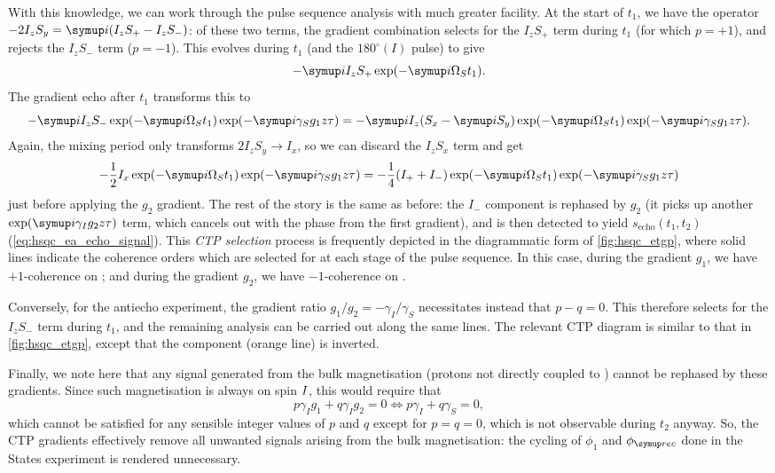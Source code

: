 With this knowledge, we can work through the pulse sequence analysis with much greater facility.
At the start of $t_1$, we have the operator $-2I_zS_y = \mi(I_zS_+ - I_zS_-)$: of these two terms, the gradient combination selects for the $I_zS_+$ term during $t_1$ (for which $p = +1$), and rejects the $I_zS_-$ term ($p = -1$).
This evolves during $t_1$ (and the $180^\circ(I)$ pulse) to give
\begin{equation}
    \label{eq:hsqc_echo_shift_aftert1}
    -\mi I_zS_+ \exp(-\mi \Omega_S t_1).
\end{equation}
The gradient echo after $t_1$ transforms this to
\begin{equation}
    \label{eq:hsqc_echo_shift_after_g1}
    -\mi I_zS_- \exp(-\mi \Omega_S t_1)\exp(-\mi \gamma_S g_1 z\tau) = -\mi I_z(S_x - \mi S_y) \exp(-\mi \Omega_S t_1)\exp(-\mi \gamma_S g_1 z\tau).
\end{equation}
Again, the mixing period only transforms $2I_zS_y \to I_x$, so we can discard the $I_zS_x$ term and get
\begin{equation}
    \label{eq:hsqc_echo_shift_before_g2}
    -\frac{1}{2} I_x \exp(-\mi \Omega_S t_1)\exp(-\mi \gamma_S g_1 z\tau)
    = -\frac{1}{4}(I_+ + I_-)\exp(-\mi \Omega_S t_1)\exp(-\mi \gamma_S g_1 z\tau)
\end{equation}
just before applying the $g_2$ gradient.
The rest of the story is the same as before: the $I_-$ component is rephased by $g_2$ (it picks up another $\exp(\mi\gamma_Ig_2 z\tau)$ term, which cancels out with the phase from the first gradient), and is then detected to yield $s_\text{echo}(t_1, t_2)$ (\cref{eq:hsqc_ea_echo_signal}).
This \textit{CTP selection} process is frequently depicted in the diagrammatic form of \cref{fig:hsqc_etgp}, where solid lines indicate the coherence orders which are selected for at each stage of the pulse sequence.
In this case, during the gradient $g_1$, we have $+1$-coherence on \carbon{}; and during the gradient $g_2$, we have $-1$-coherence on \proton{}.

Conversely, for the antiecho experiment, the gradient ratio $g_1/g_2 = -\gamma_I/\gamma_S$ necessitates instead that $p - q = 0$.
This therefore selects for the $I_zS_-$ term during $t_1$, and the remaining analysis can be carried out along the same lines.
The relevant CTP diagram is similar to that in \cref{fig:hsqc_etgp}, except that the \carbon{} component (orange line) is inverted.

Finally, we note here that any signal generated from the bulk magnetisation (protons not directly coupled to \carbon{}) cannot be rephased by these gradients.
Since such magnetisation is always on spin $I\/$, this would require that
\begin{equation}
    \label{eq:unrefocusable_bulk}
    p\gamma_I g_1 + q\gamma_I g_2 = 0 \Leftrightarrow p \gamma_I + q\gamma_S = 0,
\end{equation}
which cannot be satisfied for any sensible integer values of $p$ and $q$ except for $p = q = 0$, which is not observable during $t_2$ anyway.
So, the CTP gradients effectively remove all unwanted signals arising from the bulk magnetisation: the cycling of $\phi_1$ and $\phirec$ done in the States experiment is rendered unnecessary.

